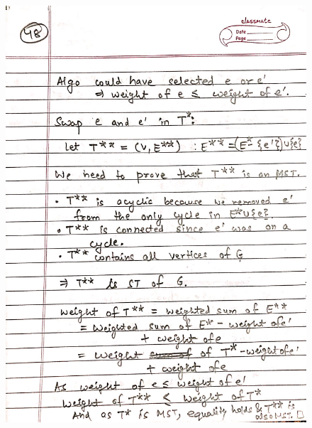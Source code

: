\begin{figure}[H]
    \centering
    \includegraphics[scale=0.25]{"./MIT 6.042J/MIT_6042J_048"}
\end{figure}
\newpage
